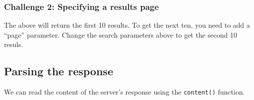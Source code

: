 \documentclass[]{book}
\begin{document}
\subsubsection*{Challenge 2: Specifying a results
page}\label{challenge-2-specifying-a-results-page}

The above will return the first 10 results. To get the next ten, you
need to add a ``page'' parameter. Change the search parameters above to
get the second 10 resuls.

\subsection{Parsing the response}\label{parsing-the-response}

We can read the content of the server's response using the
\texttt{content()} function.
\end{document}

